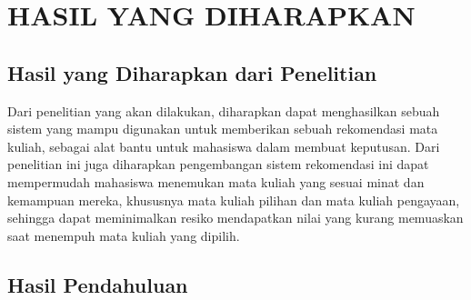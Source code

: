 \section{HASIL YANG DIHARAPKAN}

\subsection{Hasil yang Diharapkan dari Penelitian}
Dari penelitian yang akan dilakukan, diharapkan dapat menghasilkan sebuah sistem yang mampu digunakan untuk
memberikan sebuah rekomendasi mata kuliah, sebagai alat bantu untuk mahasiswa dalam membuat keputusan. Dari penelitian ini juga
diharapkan pengembangan sistem rekomendasi ini dapat mempermudah mahasiswa menemukan mata kuliah yang sesuai minat dan kemampuan mereka,
khususnya mata kuliah pilihan dan mata kuliah pengayaan, sehingga dapat meminimalkan resiko mendapatkan nilai yang kurang memuaskan saat
menempuh mata kuliah yang dipilih.

\subsection{Hasil Pendahuluan}










